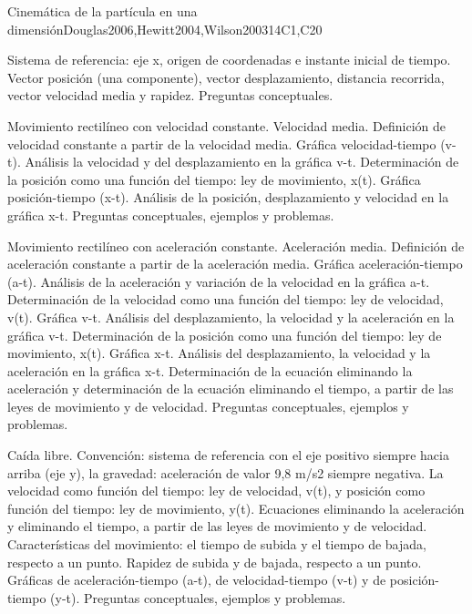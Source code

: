 \begin{syllabus}
\begin{unit}{Cinemática de la partícula en una dimensión}{}{Douglas2006,Hewitt2004,Wilson2003}{14}{C1,C20}
\begin{topics}
      \item Sistema de referencia: eje x, origen de coordenadas e instante inicial de tiempo. Vector posición (una componente), vector desplazamiento, distancia recorrida, vector velocidad media y rapidez. Preguntas conceptuales.
      \item Movimiento rectilíneo con velocidad constante. Velocidad media. Definición de velocidad constante a partir de la velocidad media. Gráfica velocidad-tiempo (v-t). Análisis la velocidad y del desplazamiento en la gráfica v-t. Determinación de la posición como una función del tiempo: ley de movimiento, x(t). Gráfica posición-tiempo (x-t). Análisis de la posición, desplazamiento y velocidad en la gráfica x-t. Preguntas conceptuales, ejemplos y problemas.
      \item Movimiento rectilíneo con aceleración constante. Aceleración media. Definición de aceleración constante a partir de la aceleración media. Gráfica aceleración-tiempo (a-t). Análisis de la aceleración y variación de la velocidad en la gráfica a-t. Determinación de la velocidad como una función del tiempo: ley de velocidad, v(t). Gráfica v-t. Análisis del desplazamiento, la velocidad y la aceleración en la gráfica v-t. Determinación de la posición como una función del tiempo: ley de movimiento, x(t). Gráfica x-t. Análisis del desplazamiento, la velocidad y la aceleración en la gráfica x-t. Determinación de la ecuación eliminando la aceleración y determinación de la ecuación eliminando el tiempo, a partir de las leyes de movimiento y de velocidad. Preguntas conceptuales, ejemplos y problemas.
      \item Caída libre. Convención: sistema de referencia con el eje positivo siempre hacia arriba (eje y), la gravedad: aceleración de valor 9,8 m/s2 siempre negativa. La velocidad como función del tiempo: ley de velocidad, v(t), y posición como función del tiempo: ley de movimiento, y(t). Ecuaciones eliminando la aceleración y eliminando el tiempo, a partir de las leyes de movimiento y de velocidad. Características del movimiento: el tiempo de subida y el tiempo de bajada, respecto a un punto. Rapidez de subida y de bajada, respecto a un punto. Gráficas de aceleración-tiempo (a-t), de velocidad-tiempo (v-t) y de posición-tiempo (y-t). Preguntas conceptuales, ejemplos y problemas.
    \end{topics}
\end{unit}


\end{syllabus}
